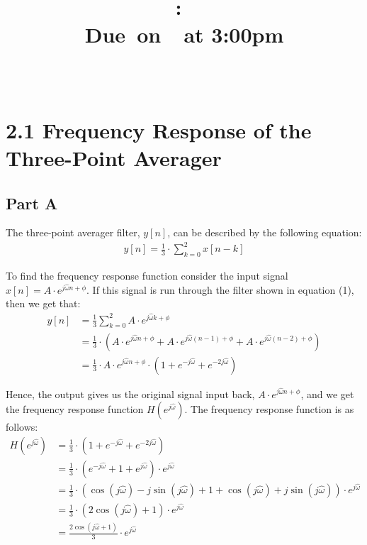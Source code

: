 \documentclass{article}
\title{
    \vspace{2in}
    \textmd{\textbf{\hmwkClass:\ \hmwkTitle}}\\
    \normalsize\vspace{0.1in}\small{Due\ on\ \hmwkDueDate\ at 3:00pm}\\
    \vspace{0.1in}\large{\textit{\hmwkClassInstructor\ \hmwkClassTime}}
    \vspace{3in}
}
\author{\textbf{\hmwkAuthorName}}
\date{}
\begin{document}
\maketitle

\pagebreak

\section{2.1 Frequency Response of the Three-Point Averager}

\subsection{Part A}

The three-point averager filter, $y[n]$, can be described by the following equation:
\begin{align}
	y[n] = \frac{1}{3} \cdot \sum_{k=0}^{2}x[n-k]
\end{align}

To find the frequency response function consider the input signal $x[n] = A \cdot e^{j \hat{\omega}n + \phi}$. If this signal is run through the filter shown in equation (1), then we get that:
\begin{align*}
	y[n] 	&= \frac{1}{3} \sum_{k=0}^{2} A \cdot e^{j \hat{\omega}k + \phi}\\
			&= \frac{1}{3} \cdot (A \cdot e^{j \hat{\omega}n + \phi} + A \cdot e^{j \hat{\omega}(n-1) + \phi} + A \cdot e^{j \hat{\omega}(n-2) + \phi})\\
			&= \frac{1}{3} \cdot A \cdot e^{j \hat{\omega}n + \phi} \cdot (1 + e^{-j \hat{\omega}} + e^{-2j \hat{\omega}})
\end{align*}

Hence, the output gives us the original signal input back, $A \cdot e^{j \hat{\omega}n + \phi}$, and we get the frequency response function $H(e^{j \hat{\omega}})$. The frequency response function is as follows:
\begin{align*}
	H(e^{j \hat{\omega}}) 	&= \frac{1}{3} \cdot (1 + e^{-j \hat{\omega}} + e^{-2j \hat{\omega}})\\
							&= \frac{1}{3} \cdot (e^{-j \hat{\omega}} + 1 + e^{j \hat{\omega}}) \cdot e^{j \hat{\omega}}\\
							&= \frac{1}{3} \cdot (\cos(j \hat{\omega}) - j \sin(j \hat{\omega}) + 1 + \cos(j \hat{\omega}) + j \sin(j \hat{\omega})) \cdot e^{j \hat{\omega}}\\
							&= \frac{1}{3} \cdot (2 \cos(j \hat{\omega}) + 1) \cdot e^{j \hat{\omega}}\\
							&= \frac{2 \cos(j \hat{\omega} + 1)}{3} \cdot e^{j \hat{\omega}}
\end{align*}
\end{document}

